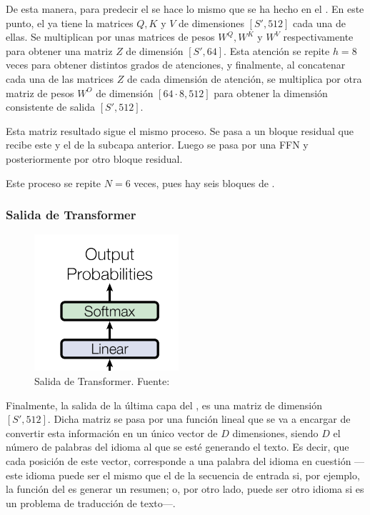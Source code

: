 De esta manera, para  predecir el  se hace lo mismo que se ha hecho en el . En este punto, el  ya tiene la matrices $Q,K$ y $V$ de dimensiones $[S', 512]$ cada una de ellas. Se multiplican por unas matrices de pesos $W^Q, W^K$ y $W^V$ respectivamente para obtener una matriz $Z$ de dimensión $[S', 64]$. Esta atención se repite $h = 8$ veces para obtener distintos grados de atenciones, y finalmente, al concatenar cada una de las matrices $Z$ de  cada dimensión de atención, se multiplica por otra matriz de pesos $W^O$ de dimensión $[64 \cdot 8, 512]$ para obtener la dimensión consistente de salida $[S', 512]$.

Esta matriz resultado sigue el mismo proceso. Se pasa a un bloque residual que recibe este  y el  de la subcapa anterior. Luego se pasa por una FFN y posteriormente por otro bloque residual. 

Este proceso se repite $N = 6$ veces, pues hay seis bloques de .

\subsubsection{Salida de Transformer}

\begin{figure}[H]
    \centering
    \includegraphics{imgs/trans_arq_5.png}
    \caption{Salida de Transformer. \scriptsize{Fuente: \parencite{transformers}}}
    \label{salida}
\end{figure}
Finalmente, la salida de la última capa del , es una matriz de dimensión $[S', 512]$. Dicha matriz se pasa por una función lineal que se va a encargar de convertir esta información en un único vector de $D$ dimensiones, siendo $D$ el número de palabras del idioma al que se esté generando el texto. Es decir, que cada posición de este vector, corresponde a una palabra del idioma en cuestión ---este idioma puede ser el mismo que el de la secuencia de entrada si, por ejemplo, la función del  es generar un resumen; o, por otro lado, puede ser otro idioma si es un problema de traducción de texto---.


